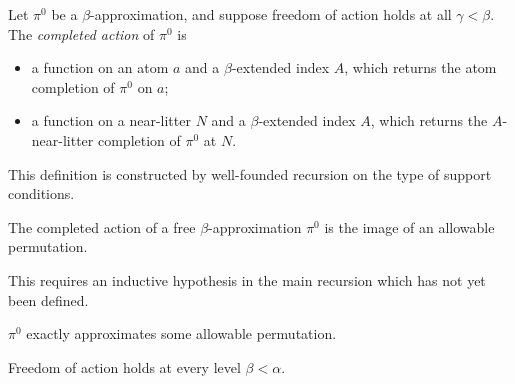 \documentclass{article}
\begin{document}
\begin{definition}
    Let \( \pi^0 \) be a \( \beta \)-approximation, and suppose freedom of action holds at all \( \gamma < \beta \).
    The \emph{completed action} of \( \pi^0 \) is
    \begin{itemize}
        \item a function on an atom \( a \) and a \( \beta \)-extended index \( A \), which returns the atom completion of \( \pi^0 \) on \( a \);
        \item a function on a near-litter \( N \) and a \( \beta \)-extended index \( A \), which returns the \( A \)-near-litter completion of \( \pi^0 \) at \( N \).
    \end{itemize}
\end{definition}
\begin{remark}
    This definition is constructed by well-founded recursion on the type of support conditions.
\end{remark}
\begin{lemma}
    The completed action of a free \( \beta \)-approximation \( \pi^0 \) is the image of an allowable permutation.
\end{lemma}
\begin{remark}
    This requires an inductive hypothesis in the main recursion which has not yet been defined.
\end{remark}
\begin{corollary}
    \( \pi^0 \) exactly approximates some allowable permutation.
\end{corollary}
\begin{theorem}
    Freedom of action holds at every level \( \beta < \alpha \).
\end{theorem}
\end{document}
